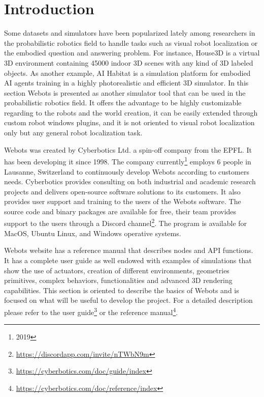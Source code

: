 \section{Introduction}

Some datasets and simulators have been popularized lately among researchers in the probabilistic robotics field to handle tasks such as visual robot localization or the embodied question and answering problem\cite{DBLP:journals/corr/abs-1810-11181}. For instance, House3D\cite{YiHouse3D} is a virtual 3D environment containing 45000 indoor 3D scenes with any kind of 3D labeled objects. As another example, AI Habitat\cite{DBLP:journals/corr/abs-1904-01201} is a simulation platform for embodied AI agents training in a highly photorealistic and efficient 3D simulator. In this section Webots is presented as another simulator tool that can be used in the probabilistic robotics field. It offers the advantage to be highly customizable regarding to the robots and the world creation, it can be easily extended through custom robot windows plugins, and it is not oriented to visual robot localization only but any general robot localization task. 

Webots was created by Cyberbotics Ltd. a spin-off company from the EPFL. It has been developing it since 1998. The company currently\footnote{2019} employs 6 people in Lausanne, Switzerland to continuously develop Webots according to customers needs. Cyberbotics provides consulting on both industrial and academic research projects and delivers open-source software solutions to its customers. It also provides user support and training to the users of the Webots software. The source code and binary packages are available for free, their team provides support to the users through a Discord channel\footnote{\url{https://discordapp.com/invite/nTWbN9m}}. The program is available for MacOS, Ubuntu Linux, and Windows operative systems\cite{cyberbotics}.

Webots website has a reference manual that describes nodes and API functions. It has a complete user guide as well endowed with examples of simulations that show the use of actuators, creation of different environments, geometries primitives, complex behaviors, functionalities and advanced 3D rendering capabilities. This section is oriented to describe the basics of Webots and is focused on what will be useful to develop the project. For a detailed description please refer to the user guide\footnote{\url{https://cyberbotics.com/doc/guide/index}} or the reference manual\footnote{\url{https://cyberbotics.com/doc/reference/index}}.

